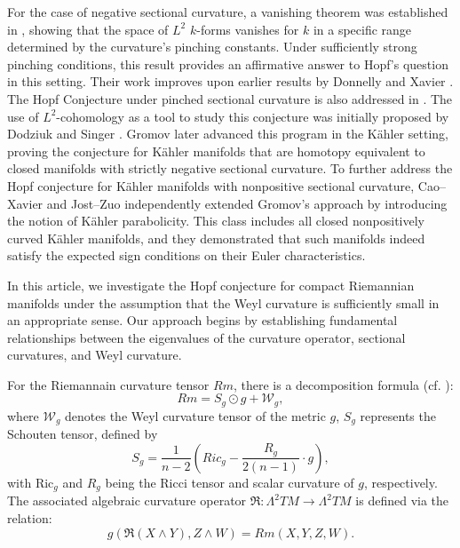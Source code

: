 \documentclass[12pt, twoside]{article}
\theoremstyle{definition}
\numberwithin{equation}{section}
\begin{document}
For the case of negative sectional curvature, a vanishing theorem was established in \cite{JX00}, showing that the space of $L^{2}$ $k$-forms vanishes for $k$ in a specific range determined by the curvature's pinching constants. Under sufficiently strong pinching conditions, this result provides an affirmative answer to Hopf's question in this setting. Their work improves upon earlier results by Donnelly and Xavier \cite{DX84}. The Hopf Conjecture under pinched sectional curvature is also addressed in \cite{BK78}. The use of $L^{2}$-cohomology as a tool to study this conjecture was initially proposed by Dodziuk \cite{Dod79} and Singer \cite{Sin77}. Gromov \cite{Gro91} later advanced this program in the K\"{a}hler setting, proving the conjecture for K\"{a}hler manifolds that are homotopy equivalent to closed manifolds with strictly negative sectional curvature. To further address the Hopf conjecture for K\"{a}hler manifolds with nonpositive sectional curvature, Cao–Xavier \cite{CX01} and Jost–Zuo \cite{JZ00} independently extended Gromov’s approach by introducing the notion of K\"{a}hler parabolicity. This class includes all closed nonpositively curved K\"{a}hler manifolds, and they demonstrated that such manifolds indeed satisfy the expected sign conditions on their Euler characteristics.


In this article, we investigate the Hopf conjecture for compact Riemannian manifolds under the assumption that the Weyl curvature is sufficiently small in an appropriate sense. Our approach begins by establishing fundamental relationships between the eigenvalues of the curvature operator, sectional curvatures, and Weyl curvature.

For the Riemannain curvature tensor $Rm$, there is a decomposition formula (cf. \cite{Cha06,Pet16}):
\begin{equation*}
Rm=S_{g}\odot g+\mathcal{W}_{g},
\end{equation*}
where $\mathcal{W}_{g}$ denotes the Weyl curvature tensor of the metric $g$, $S_{g}$ represents the Schouten tensor, defined by
\begin{equation*}
S_{g} = \frac{1}{n-2}\left(Ric_{g} - \frac{R_{g}}{2(n-1)} \cdot g\right),
\end{equation*}
with $\text{Ric}_{g}$ and $R_{g}$ being the Ricci tensor and scalar curvature of $g$, respectively. The associated algebraic curvature operator $\mathfrak{R}: \Lambda^{2}TM \rightarrow \Lambda^{2}TM$ is defined via the relation:
$$g(\mathfrak{R}(X\wedge Y),Z\wedge W)=Rm(X,Y,Z,W).$$
\end{document}
